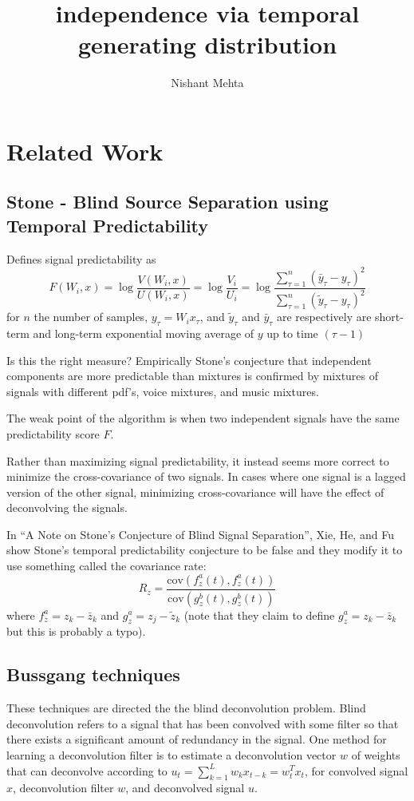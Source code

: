 \documentclass{article}
\title{independence via temporal generating distribution}
\author{Nishant Mehta}
\begin{document}
  \maketitle

  \section{Related Work}

  \subsection{Stone - Blind Source Separation using Temporal Predictability}

  Defines signal predictability as
  \[
  F(W_i, x) = \log \frac{V(W_i, x)}{U(W_i,x)} = \log \frac{V_i}{U_i}
  = \log \frac{\sum_{\tau = 1}^n (\bar{y}_{\tau} - y_{\tau})^2}{\sum_{\tau = 1}^n (\tilde{y}_{\tau} - y_{\tau})^2}
  \]
  for $n$ the number of samples, $y_{\tau} = W_i x_{\tau}$, and $\tilde{y}_{\tau}$ and $\bar{y}_{\tau}$ are respectively are short-term and long-term exponential moving average of $y$ up to time $(\tau - 1)$

  Is this the right measure? Empirically Stone's conjecture that independent components are more predictable than mixtures is confirmed by mixtures of signals with different pdf's, voice mixtures, and music mixtures.

  The weak point of the algorithm is when two independent signals have the same predictability score $F$.

  Rather than maximizing signal predictability, it instead seems more correct to minimize the cross-covariance of two signals. In cases where one signal is a lagged version of the other signal, minimizing cross-covariance will have the effect of deconvolving the signals.

  In ``A Note on Stone's Conjecture of Blind Signal Separation'', Xie, He, and Fu show Stone's temporal predictability conjecture to be false and they modify it to use something called the covariance rate:
\[
R_z = \frac{\text{cov}(f_z^a(t), f_z^a(t))}{\text{cov}(g_z^b(t), g_z^b(t))}
\]
where $f_z^a = z_k - \bar{z}_k$ and $g_z^a = z_j - \tilde{z}_k$ (note that they claim to define $g_z^a = z_k - \bar{z}_k$ but this is probably a typo).

  \subsection{Bussgang techniques}
  These techniques are directed the the blind deconvolution problem. Blind deconvolution refers to a signal that has been convolved with some filter so that there exists a significant amount of redundancy in the signal. One method for learning a deconvolution filter is to estimate a deconvolution vector $w$ of weights that can deconvolve according to $u_t = \sum_{k=1}^L w_k x_{t-k} = w_t^T x_t$, for convolved signal $x$, deconvolution filter $w$, and deconvolved signal $u$.
\end{document}
